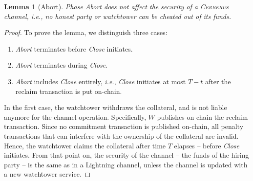 \documentclass[twocolumn,showpacs,%
  nofootinbib,aps,superscriptaddress,%
  eqsecnum,prd,notitlepage,showkeys,10pt]{revtex4-1}
\newtheorem{lemma}{Lemma}
\newcommand{\ie}{{\em i.e.}}
\newcommand{\sys}{\textsc{Cerberus}\xspace}
\begin{document}
\begin{lemma}[Abort]\label{lem:abort}
Phase \textit{Abort} does not affect the security of a \sys channel, \ie, no honest party or watchtower can be cheated out of its funds.
\end{lemma}
\begin{proof}
To prove the lemma, we distinguish three cases:
\begin{enumerate}[label=(\alph*)]
    \item \textit{Abort} terminates before \textit{Close} initiates.
    \item \textit{Abort} terminates during \textit{Close}.
    \item \textit{Abort} includes \textit{Close} entirely, \ie, \textit{Close} initiates at most $T-t$ after the reclaim transaction is put on-chain.
\end{enumerate}

In the first case, the watchtower withdraws the collateral, and is not liable anymore for the channel operation.
Specifically, $W$ publishes on-chain the reclaim transaction. Since no commitment transaction is published on-chain, all penalty transactions that can interfere with the ownership of the collateral are invalid. Hence, the watchtower claims the collateral after time $T$ elapses -- before  \textit{Close} initiates.
From that point on, the security of the channel -- the funds of the hiring party -- is the same as in a Lightning channel, unless the channel is updated with a new watchtower service.


\end{proof}
\end{document}
